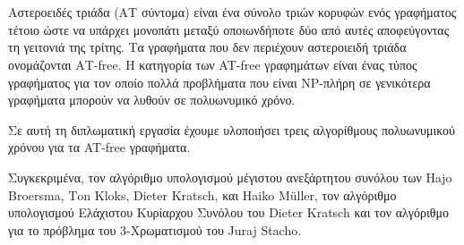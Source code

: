 \chapter*{\abstractname}
\addstarredchapter{\abstractname} %
\makecseabstract


\noindent Αστεροειδές τριάδα (ΑΤ σύντομα) είναι ένα σύνολο τριών κορυφών ενός γραφήματος τέτοιο ώστε να υπάρχει μονοπάτι μεταξύ οποιωνδήποτε δύο από αυτές αποφεύγοντας τη γειτονιά της τρίτης. Τα γραφήματα που δεν περιέχουν αστεροιειδή τριάδα ονομάζονται ΑT-free. Η κατηγορία των AT-free γραφημάτων είναι ένας τύπος γραφήματος για τον οποίο πολλά προβλήματα που είναι NP-πλήρη σε γενικότερα γραφήματα μπορούν να λυθούν σε πολυωνυμικό χρόνο.

Σε αυτή τη διπλωματική εργασία έχουμε υλοποιήσει τρεις αλγορίθμους πολυωνυμικού χρόνου για τα AT-free γραφήματα.

Συγκεκριμένα, τον αλγόριθμο υπολογισμού μέγιστου ανεξάρτητου συνόλου των Ηajo Βroersma, Τon Κloks, Dieter Kratsch, 
και Ηaiko Μüller\cite{at-free-independent-sets}, τον αλγόριθμο υπολογισμού Ελάχιστου Κυρίαρχου Συνόλου του Dieter Kratsch\cite{at-free-domination} και τον αλγόριθμο για το πρόβλημα του 3-Χρωματισμού του Juraj Stacho\cite{at-free-3-colouring}. 
